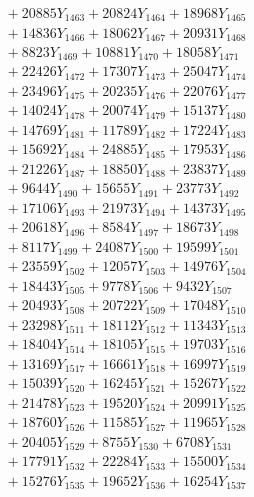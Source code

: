 \documentclass[a4paper,10pt]{article}
\begin{document}
{\begin{align}
&\;  + 20885 Y_{1463} + 20824 Y_{1464} + 18968 Y_{1465} \\[0.3ex]
&\;  + 14836 Y_{1466} + 18062 Y_{1467} + 20931 Y_{1468} \\[0.5ex]\allowbreak
&\;  + 8823 Y_{1469} + 10881 Y_{1470} + 18058 Y_{1471} \\[0.3ex]
&\;  + 22426 Y_{1472} + 17307 Y_{1473} + 25047 Y_{1474} \\[0.3ex]
&\;  + 23496 Y_{1475} + 20235 Y_{1476} + 22076 Y_{1477} \\[0.3ex]
&\;  + 14024 Y_{1478} + 20074 Y_{1479} + 15137 Y_{1480} \\[0.3ex]
&\;  + 14769 Y_{1481} + 11789 Y_{1482} + 17224 Y_{1483} \\[0.3ex]
&\;  + 15692 Y_{1484} + 24885 Y_{1485} + 17953 Y_{1486} \\[0.3ex]
&\;  + 21226 Y_{1487} + 18850 Y_{1488} + 23837 Y_{1489} \\[0.3ex]
&\;  + 9644 Y_{1490} + 15655 Y_{1491} + 23773 Y_{1492} \\[0.3ex]
&\;  + 17106 Y_{1493} + 21973 Y_{1494} + 14373 Y_{1495} \\[0.3ex]
&\;  + 20618 Y_{1496} + 8584 Y_{1497} + 18673 Y_{1498} \\[0.5ex]\allowbreak
&\;  + 8117 Y_{1499} + 24087 Y_{1500} + 19599 Y_{1501} \\[0.3ex]
&\;  + 23559 Y_{1502} + 12057 Y_{1503} + 14976 Y_{1504} \\[0.3ex]
&\;  + 18443 Y_{1505} + 9778 Y_{1506} + 9432 Y_{1507} \\[0.3ex]
&\;  + 20493 Y_{1508} + 20722 Y_{1509} + 17048 Y_{1510} \\[0.3ex]
&\;  + 23298 Y_{1511} + 18112 Y_{1512} + 11343 Y_{1513} \\[0.3ex]
&\;  + 18404 Y_{1514} + 18105 Y_{1515} + 19703 Y_{1516} \\[0.3ex]
&\;  + 13169 Y_{1517} + 16661 Y_{1518} + 16997 Y_{1519} \\[0.3ex]
&\;  + 15039 Y_{1520} + 16245 Y_{1521} + 15267 Y_{1522} \\[0.3ex]
&\;  + 21478 Y_{1523} + 19520 Y_{1524} + 20991 Y_{1525} \\[0.3ex]
&\;  + 18760 Y_{1526} + 11585 Y_{1527} + 11965 Y_{1528} \\[0.5ex]\allowbreak
&\;  + 20405 Y_{1529} + 8755 Y_{1530} + 6708 Y_{1531} \\[0.3ex]
&\;  + 17791 Y_{1532} + 22284 Y_{1533} + 15500 Y_{1534} \\[0.3ex]
&\;  + 15276 Y_{1535} + 19652 Y_{1536} + 16254 Y_{1537} \\[0.3ex]

\end{align}}
\end{document}
